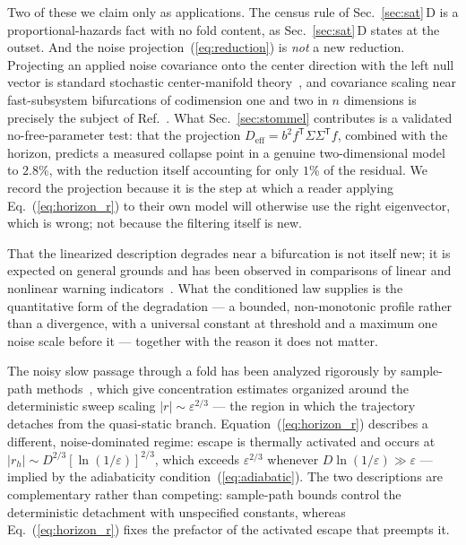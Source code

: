 \documentclass[%
 twocolumn,
 superscriptaddress,
 amsmath,amssymb,
 aps,
 pre,
 floatfix,
]{revtex4-2}
\begin{document}
Two of these we claim only as applications.  The census rule of Sec.~\ref{sec:sat}\,D is a proportional-hazards fact with no fold content, as Sec.~\ref{sec:sat}\,D states at the outset.  And the noise projection~(\ref{eq:reduction}) is \emph{not} a new reduction.  Projecting an applied noise covariance onto the center direction with the left null vector is standard stochastic center-manifold theory~\cite{Boxler1989,RobertsSCM2008}, and covariance scaling near fast-subsystem bifurcations of codimension one and two in $n$ dimensions is precisely the subject of Ref.~\cite{Kuehn2013}.  What Sec.~\ref{sec:stommel} contributes is a validated no-free-parameter test: that the projection $D_{\mathrm{eff}}=b^2f^{\mathsf T}\Sigma\Sigma^{\mathsf T}f$, combined with the horizon, predicts a measured collapse point in a genuine two-dimensional model to $2.8\%$, with the reduction itself accounting for only $1\%$ of the residual.  We record the projection because it is the step at which a reader applying Eq.~(\ref{eq:horizon_r}) to their own model will otherwise use the right eigenvector, which is wrong; not because the filtering itself is new.

That the linearized description degrades near a bifurcation is not itself new; it is expected on general grounds and has been observed in comparisons of linear and nonlinear warning indicators~\cite{Kuehn2011,Dakos2024}.  What the conditioned law supplies is the quantitative form of the degradation --- a bounded, non-monotonic profile rather than a divergence, with a universal constant at threshold and a maximum one noise scale before it --- together with the reason it does not matter.

The noisy slow passage through a fold has been analyzed rigorously by sample-path methods~\cite{BerglundGentz2006}, which give concentration estimates organized around the deterministic sweep scaling $|r|\sim\varepsilon^{2/3}$ --- the region in which the trajectory detaches from the quasi-static branch.  Equation~(\ref{eq:horizon_r}) describes a different, noise-dominated regime: escape is thermally activated and occurs at $|r_h|\sim D^{2/3}[\ln(1/\varepsilon)]^{2/3}$, which exceeds $\varepsilon^{2/3}$ whenever $D\ln(1/\varepsilon)\gg\varepsilon$ --- implied by the adiabaticity condition~(\ref{eq:adiabatic}).  The two descriptions are complementary rather than competing: sample-path bounds control the deterministic detachment with unspecified constants, whereas Eq.~(\ref{eq:horizon_r}) fixes the prefactor of the activated escape that preempts it.
\end{document}
